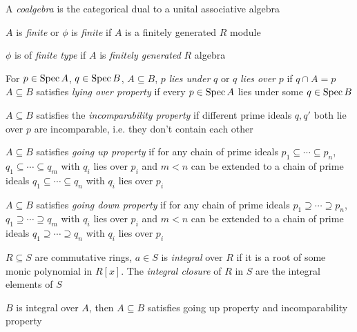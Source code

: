 \documentclass[main]{subfiles}
\begin{document}
\begin{definition}
A \textit{coalgebra} is the categorical dual to a unital associative algebra
\end{definition}

\begin{definition}
$A$ is \textit{finite} or $\phi$ is \textit{finite} if $A$ is a finitely generated $R$ module \par
$\phi$ is of \textit{finite type} if $A$ is \textit{finitely generated} $R$ algebra
\end{definition}

\begin{definition}
For $p\in \operatorname{Spec} A$, $q\in \operatorname{Spec} B$, $A\subseteq B$, $p$ \textit{lies under} $q$ or $q$ \textit{lies over} $p$ if $q\cap A=p$
$A\subseteq B$ satisfies \textit{lying over property} if every $p\in \operatorname{Spec} A$ lies under some $q\in \operatorname{Spec} B$ \par
$A\subseteq B$ satisfies the \textit{incomparability property} if different prime ideals $q,q'$ both lie over $p$ are incomparable, i.e. they don't contain each other \par
$A\subseteq B$ satisfies \textit{going up property} if for any chain of prime ideals $p_1\subseteq\cdots\subseteq p_n$, $q_1\subseteq\cdots\subseteq q_m$ with $q_i$ lies over $p_i$ and $m<n$ can be extended to a chain of prime ideals $q_1\subseteq\cdots\subseteq q_n$ with $q_i$ lies over $p_i$ \par
$A\subseteq B$ satisfies \textit{going down property} if for any chain of prime ideals $p_1\supseteq\cdots\supseteq p_n$, $q_1\supseteq\cdots\supseteq q_m$ with $q_i$ lies over $p_i$ and $m<n$ can be extended to a chain of prime ideals $q_1\supseteq\cdots\supseteq q_n$ with $q_i$ lies over $p_i$
\end{definition}

\begin{definition}
$R\subseteq S$ are commutative rings, $a\in S$ is \textit{integral} over $R$ if it is a root of some monic polynomial in $R[x]$. The \textit{integral closure} of $R$ in $S$ are the integral elements of $S$
\end{definition}

\begin{theorem}\label{Going up and Going down theorems}
$B$ is integral over $A$, then $A\subseteq B$ satisfies going up property and incomparability property
\end{theorem}
\end{document}
